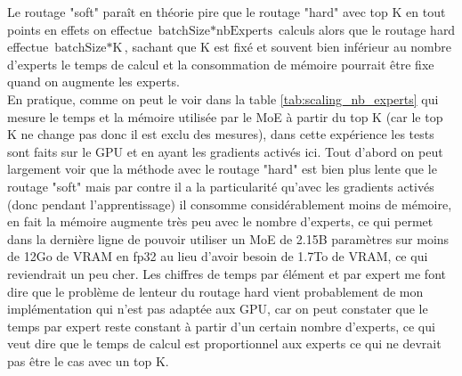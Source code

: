 \documentclass{article}
\begin{document}
Le routage "soft" paraît en théorie pire que le routage "hard" avec top K en tout points en effets on effectue $\text{batchSize} * \text{nbExperts}$ calculs alors que le routage hard effectue $\text{batchSize} * \text{K}$, sachant que K est fixé et souvent bien inférieur au nombre d'experts le temps de calcul et la consommation de mémoire pourrait être fixe quand on augmente les experts. \\
En pratique, comme on peut le voir dans la table \ref{tab:scaling_nb_experts} qui mesure le temps et la mémoire utilisée par le MoE à partir du top K (car le top K ne change pas donc il est exclu des mesures), dans cette expérience les tests sont faits sur le GPU et en ayant les gradients activés ici. Tout d'abord on peut largement voir que la méthode avec le routage "hard" est bien plus lente que le routage "soft" mais par contre il a la particularité qu'avec les gradients activés (donc pendant l'apprentissage) il consomme considérablement moins de mémoire, en fait la mémoire augmente très peu avec le nombre d'experts, ce qui permet dans la dernière ligne de pouvoir utiliser un MoE de 2.15B paramètres sur moins de 12Go de VRAM en fp32 au lieu d'avoir besoin de 1.7To de VRAM, ce qui reviendrait un peu cher. Les chiffres de temps par élément et par expert me font dire que le problème de lenteur du routage hard vient probablement de mon implémentation qui n'est pas adaptée aux GPU, car on peut constater que le temps par expert reste constant à partir d'un certain nombre d'experts, ce qui veut dire que le temps de calcul est proportionnel aux experts ce qui ne devrait pas être le cas avec un top K.
\end{document}
